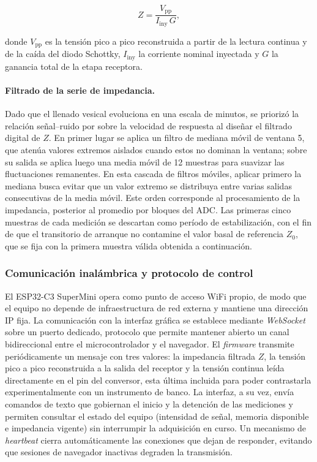\documentclass[12pt,a4paper]{article}
\begin{document}
\begin{equation}
    Z=\frac{V_{\mathrm{pp}}}{I_{\mathrm{iny}}\,G},
\end{equation}

donde $V_{\mathrm{pp}}$ es la tensión pico a pico reconstruida a partir de la lectura continua y de la
caída del diodo Schottky, $I_{\mathrm{iny}}$ la corriente nominal inyectada y $G$ la ganancia total de la
etapa receptora.

\paragraph{Filtrado de la serie de impedancia.}
Dado que el llenado vesical evoluciona en una escala de minutos, se priorizó la relación señal--ruido
por sobre la velocidad de respuesta al diseñar el filtrado digital de $Z$. En primer lugar se aplica un
filtro de mediana móvil de ventana 5, que atenúa valores extremos aislados cuando estos no dominan
la ventana; sobre su salida se aplica luego una media móvil de 12 muestras para suavizar las
fluctuaciones remanentes. En esta cascada de filtros móviles, aplicar primero la mediana busca
evitar que un valor extremo se distribuya entre varias salidas consecutivas de la media móvil.
Este orden corresponde al procesamiento de la impedancia, posterior al promedio por bloques del ADC.
Las primeras cinco muestras de cada medición se descartan como período de estabilización, con
el fin de que el transitorio de arranque no contamine el valor basal de referencia $Z_0$, que se fija con
la primera muestra válida obtenida a continuación.


\subsubsection{Comunicación inalámbrica y protocolo de control}

El ESP32-C3 SuperMini opera como punto de acceso WiFi propio, de modo que el equipo no depende de infraestructura
de red externa y mantiene una dirección IP fija. La comunicación con la interfaz gráfica se establece
mediante \textit{WebSocket} sobre un puerto dedicado, protocolo que permite mantener abierto un canal
bidireccional entre el microcontrolador y el navegador. El \textit{firmware} transmite periódicamente un mensaje
con tres valores: la impedancia filtrada $Z$, la tensión pico a pico reconstruida a la salida del
receptor y la tensión continua leída directamente en el pin del conversor, esta última incluida para
poder contrastarla experimentalmente con un instrumento de banco. La interfaz, a su vez, envía comandos
de texto que gobiernan el inicio y la detención de las mediciones y permiten consultar el estado del
equipo (intensidad de señal, memoria disponible e impedancia vigente) sin interrumpir la adquisición en
curso. Un mecanismo de \textit{heartbeat} cierra automáticamente las conexiones que dejan de responder,
evitando que sesiones de navegador inactivas degraden la transmisión.
\end{document}
